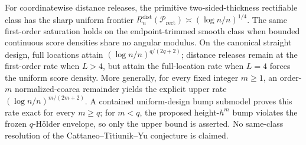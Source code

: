 For coordinatewise distance releases, the primitive two-sided-thickness rectifiable class has the sharp uniform frontier \(R_n^{\mathrm{dist}}(\mathcal P_{\mathrm{rect}})\asymp(\log n/n)^{1/4}\).  The same first-order saturation holds on the endpoint-trimmed smooth class when bounded continuous score densities share no angular modulus.  On the canonical straight design, full locations attain \((\log n/n)^{q/(2q+2)}\); distance releases remain at the first-order rate when \(L>4\), but attain the full-location rate when \(L=4\) forces the uniform score density.  More generally, for every fixed integer \(m\geq1\), an order-\(m\) normalized-coarea remainder yields the explicit upper rate \((\log n/n)^{m/(2m+2)}\).  A contained uniform-design bump submodel proves this rate exact for every \(m\geq q\); for \(m<q\), the proposed height-\(h^m\) bump violates the frozen \(q\)-H\"older envelope, so only the upper bound is asserted.  No same-class resolution of the Cattaneo--Titiunik--Yu conjecture is claimed.